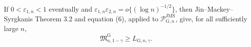 If \(0<\varepsilon_{1,n}<1\) eventually and \(\varepsilon_{1,n}\varepsilon_{2,n}=o\{(\log n)^{-1/2}\}\), then Jin--Mackey--Syrgkanis Theorem 3.2 and equation (6), applied to \(\mathcal P_{\mathrm G,n}^{\mathrm{JMS}}\), give, for all sufficiently large \(n\),
\[
 \mathfrak M_{n,1-\gamma}^{\mathrm G}\ge L_{\mathrm G,n,\gamma}.
\]